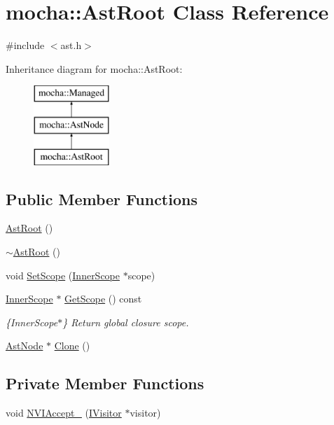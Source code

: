\hypertarget{classmocha_1_1_ast_root}{
\section{mocha::AstRoot Class Reference}
\label{classmocha_1_1_ast_root}
}


{\ttfamily \#include $<$ast.h$>$}

Inheritance diagram for mocha::AstRoot:\begin{figure}[H]
\begin{center}
\leavevmode
\includegraphics[height=3.000000cm]{classmocha_1_1_ast_root}
\end{center}
\end{figure}
\subsection*{Public Member Functions}
\begin{DoxyCompactItemize}
\item 
\hyperlink{classmocha_1_1_ast_root_a119834bdf57c55c0282ba7be3d64a2f8}{AstRoot} ()
\item 
\hyperlink{classmocha_1_1_ast_root_a817cb08076802b3a549c1c37ea51f693}{$\sim$AstRoot} ()
\item 
void \hyperlink{classmocha_1_1_ast_root_a93adb8beb44c8d6dfb8c750bf5173f3f}{SetScope} (\hyperlink{classmocha_1_1_inner_scope}{InnerScope} $\ast$scope)
\item 
\hyperlink{classmocha_1_1_inner_scope}{InnerScope} $\ast$ \hyperlink{classmocha_1_1_ast_root_aeef3085a6bf6064e9438338274b42827}{GetScope} () const 
\begin{DoxyCompactList}\small\item\em \{InnerScope$\ast$\} Return global closure scope. \end{DoxyCompactList}\item 
\hyperlink{classmocha_1_1_ast_node}{AstNode} $\ast$ \hyperlink{classmocha_1_1_ast_root_af325e103d1f65d71d108eea400196287}{Clone} ()
\end{DoxyCompactItemize}
\subsection*{Private Member Functions}
\begin{DoxyCompactItemize}
\item 
void \hyperlink{classmocha_1_1_ast_root_ad54b98a08505d4b63576ecf831e6376c}{NVIAccept\_\-} (\hyperlink{classmocha_1_1_i_visitor}{IVisitor} $\ast$visitor)
\end{DoxyCompactItemize}
